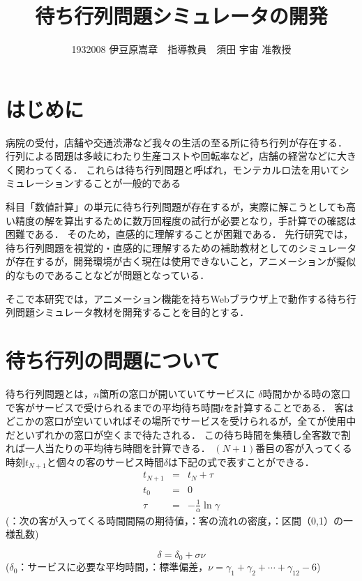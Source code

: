 \documentclass[twocolumn,10pt,a4j]{ltjsarticle}
\title{待ち行列問題シミュレータの開発}
\author{1932008 伊豆原嵩章　指導教員　須田 宇宙 准教授}
\date{}
\begin{document}
\maketitle

\section{はじめに}
病院の受付，店舗や交通渋滞など我々の生活の至る所に待ち行列が存在する．
行列による問題は多岐にわたり生産コストや回転率など，店舗の経営などに大きく関わってくる．
これらは待ち行列問題と呼ばれ，モンテカルロ法を用いてシミュレーションすることが一般的である

科目「数値計算」の単元に待ち行列問題が存在するが，実際に解こうとしても高い精度の解を算出するために数万回程度の試行が必要となり，手計算での確認は困難である．
そのため，直感的に理解することが困難である．
先行研究では，待ち行列問題を視覚的・直感的に理解するための補助教材としてのシミュレータが存在するが，開発環境が古く現在は使用できないこと，アニメーションが擬似的なものであることなどが問題となっている\cite{past}．

そこで本研究では，アニメーション機能を持ちWebブラウザ上で動作する待ち行列問題シミュレータ教材を開発することを目的とする．

\section{待ち行列の問題について}
待ち行列問題とは，$n$箇所の窓口が開いていてサービスに $\delta$時間かかる時の窓口で客がサービスで受けられるまでの平均待ち時間$t$を計算することである．
客はどこかの窓口が空いていればその場所でサービスを受けられるが，全てが使用中だといずれかの窓口が空くまで待たされる．
この待ち時間を集積し全客数で割れば一人当たりの平均待ち時間を計算できる．
$(N+1)$番目の客が入ってくる時刻$t_{N+1}$と個々の客のサービス時間$\delta$は下記の式で表すことができる\cite{text}．
\vspace{-4mm}
\begin{eqnarray}
t_{N+1} & = & t_N+\tau\\
t_0 & = & 0\\
\tau & = & -\frac{1}{\alpha}\ln\gamma
\end{eqnarray}
(\tau：次の客が入ってくる時間間隔の期待値，\alpha：客の流れの密度，\gamma：区間（0,1）の一様乱数)

\begin{equation}
\delta=\delta_0+\sigma\nu
\end{equation}
\vspace{-1mm}
($\delta_0$：サービスに必要な平均時間，\sigma：標準偏差，$\nu=\gamma_1+\gamma_2+\cdots+\gamma_{12}-6$)
\end{document}
